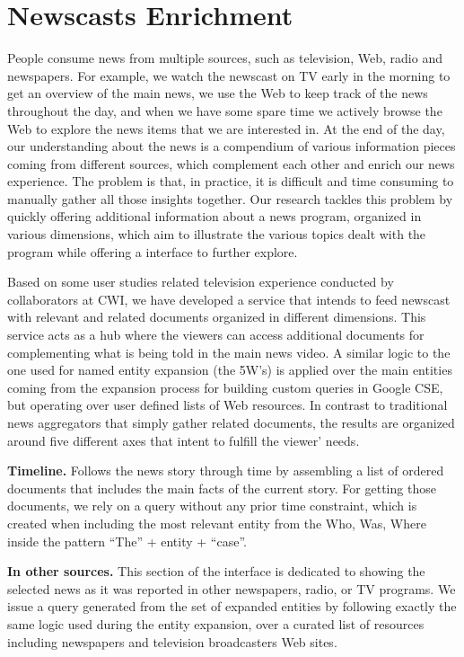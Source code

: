 \documentclass[a4paper,11pt]{report}
\begin{document}
\section{Newscasts Enrichment}
\label{newscasts}
People consume news from multiple sources, such as television, Web, radio and newspapers. For example, we watch the newscast on TV early in the morning to get an overview of the main news, we use the Web to keep track of the news throughout the day, and when we have some spare time we actively browse the Web to explore the news items that we are interested in. At the end of the day, our understanding about the news is a compendium of various information pieces coming from different sources, which complement each other and enrich our news experience. The problem is that, in practice, it is difficult and time consuming to manually gather all those insights together. Our research tackles this problem by quickly offering additional information about a news program, organized in various dimensions, which aim to illustrate the various topics dealt with the program while offering a interface to further explore.

Based on some user studies related television experience conducted by collaborators at CWI, we have developed a service that intends to feed newscast with relevant and related documents organized in different dimensions. This service acts as a hub where the viewers can access additional documents for complementing what is being told in the main news video. A similar logic to the one used for named entity expansion (the 5W's) is applied over the main entities coming from the expansion process for building custom queries in Google CSE, but operating over user defined lists of Web resources. In contrast to traditional news aggregators that simply gather related documents, the results are organized around five different axes that intent to fulfill the viewer' needs.

\textbf{Timeline.} Follows the news story through time by assembling a list of ordered documents that includes the main facts of the current story. For getting those documents, we rely on a query without any prior time constraint, which is created when including the most relevant entity from the Who, Was, Where inside the pattern ``The'' + entity + ``case''.

\textbf{In other sources.} This section of the interface is dedicated to showing the selected news as it was reported in other newspapers, radio, or TV programs. We issue a query generated from the set of expanded entities by following exactly the same logic used during the entity expansion, over a curated list of resources including newspapers and television broadcasters Web sites.
\end{document}
